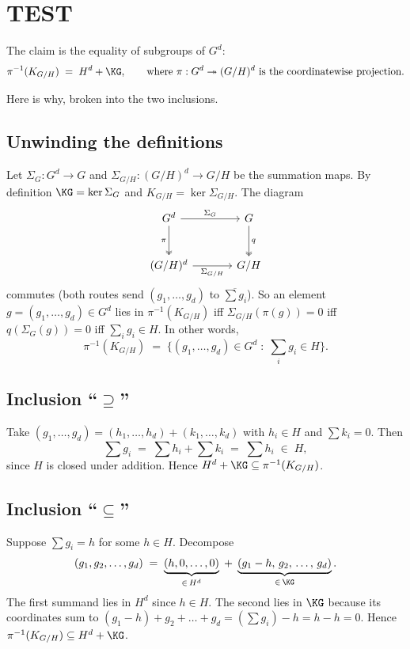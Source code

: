 \section{TEST}

The claim is the equality of subgroups of $G^d$:
\[
\pi^{-1}(K_{G/H}) \;=\; H^d + \KG, \qquad \text{where } \pi : G^d \twoheadrightarrow (G/H)^d \text{ is the coordinatewise projection.}
\]

Here is why, broken into the two inclusions.

\subsection*{Unwinding the definitions}
Let $\Sigma_G : G^d \to G$ and $\Sigma_{G/H} : (G/H)^d \to G/H$ be the summation maps. By definition $\KG = \ker \Sigma_G$ and $K_{G/H} = \ker \Sigma_{G/H}$. The diagram
\[
\begin{tikzcd}[row sep=large, column sep=large]
G^d \arrow[r, "\Sigma_G"] \arrow[d, "\pi"', twoheadrightarrow] & G \arrow[d, "q", twoheadrightarrow] \\
(G/H)^d \arrow[r, "\Sigma_{G/H}"'] & G/H
\end{tikzcd}
\]
commutes (both routes send $(g_1,\dots,g_d)$ to $\overline{\sum g_i}$). So an element $g = (g_1,\dots,g_d) \in G^d$ lies in $\pi^{-1}(K_{G/H})$ iff $\Sigma_{G/H}(\pi(g)) = 0$ iff $q(\Sigma_G(g)) = 0$ iff $\sum_i g_i \in H$. In other words,
\[
\pi^{-1}(K_{G/H}) \;=\; \bigl\{(g_1,\dots,g_d) \in G^d \;:\; \textstyle\sum_i g_i \in H\bigr\}.
\]

\subsection*{Inclusion ``$\supseteq$''}
Take $(g_1,\dots,g_d) = (h_1,\dots,h_d) + (k_1,\dots,k_d)$ with $h_i \in H$ and $\sum k_i = 0$. Then
\[
\sum g_i \;=\; \sum h_i + \sum k_i \;=\; \sum h_i \;\in\; H,
\]
since $H$ is closed under addition. Hence $H^d + \KG \subseteq \pi^{-1}(K_{G/H})$.

\subsection*{Inclusion ``$\subseteq$''}
Suppose $\sum g_i = h$ for some $h \in H$. Decompose
\[
(g_1, g_2, \dots, g_d) \;=\; \underbrace{(h, 0, \dots, 0)}_{\in\, H^d} \;+\; \underbrace{(g_1 - h,\, g_2,\, \dots,\, g_d)}_{\in\, \KG}.
\]
The first summand lies in $H^d$ since $h \in H$. The second lies in $\KG$ because its coordinates sum to $(g_1 - h) + g_2 + \dots + g_d = (\sum g_i) - h = h - h = 0$. Hence $\pi^{-1}(K_{G/H}) \subseteq H^d + \KG$.

